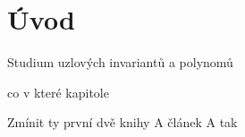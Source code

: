 \chapter*{Úvod}

Studium uzlových invariantů a polynomů

co v které kapitole

Zmínit ty první dvě knihy
A článek 
A tak


